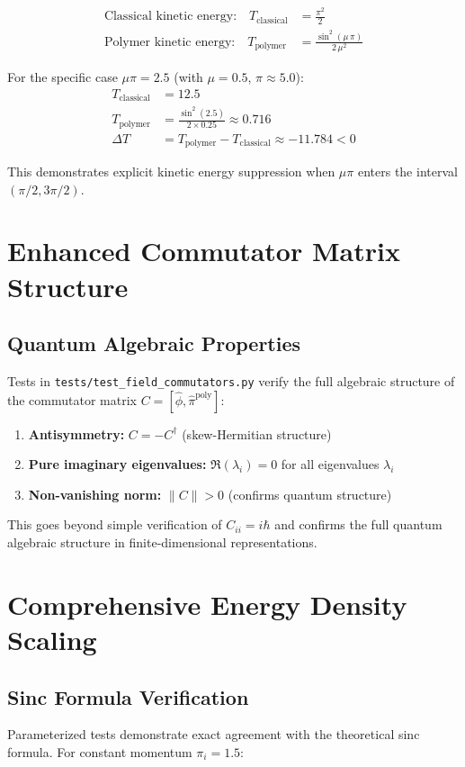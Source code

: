 \documentclass[11pt]{article}
\begin{document}
\begin{align}
\text{Classical kinetic energy:} \quad T_{\text{classical}} &= \frac{\pi^2}{2} \\
\text{Polymer kinetic energy:} \quad T_{\text{polymer}} &= \frac{\sin^2(\mu\,\pi)}{2\,\mu^2}
\end{align}

For the specific case $\mu\pi = 2.5$ (with $\mu = 0.5$, $\pi \approx 5.0$):
\begin{align}
T_{\text{classical}} &= 12.5 \\
T_{\text{polymer}} &= \frac{\sin^2(2.5)}{2 \times 0.25} \approx 0.716 \\
\Delta T &= T_{\text{polymer}} - T_{\text{classical}} \approx -11.784 < 0
\end{align}

This demonstrates explicit kinetic energy suppression when $\mu\pi$ enters the interval $(\pi/2, 3\pi/2)$.

\section{Enhanced Commutator Matrix Structure}

\subsection{Quantum Algebraic Properties}
Tests in \texttt{tests/test\_field\_commutators.py} verify the full algebraic structure of the commutator matrix $C = [\hat{\phi}, \hat{\pi}^{\text{poly}}]$:

\begin{enumerate}
\item \textbf{Antisymmetry:} $C = -C^\dagger$ (skew-Hermitian structure)
\item \textbf{Pure imaginary eigenvalues:} $\Re(\lambda_i) = 0$ for all eigenvalues $\lambda_i$
\item \textbf{Non-vanishing norm:} $\|C\| > 0$ (confirms quantum structure)
\end{enumerate}

This goes beyond simple verification of $C_{ii} = i\hbar$ and confirms the full quantum algebraic structure in finite-dimensional representations.

\section{Comprehensive Energy Density Scaling}

\subsection{Sinc Formula Verification}
Parameterized tests demonstrate exact agreement with the theoretical sinc formula. For constant momentum $\pi_i = 1.5$:
\end{document}
